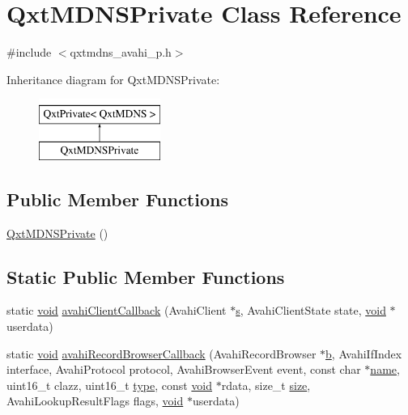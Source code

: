 \hypertarget{class_qxt_m_d_n_s_private}{\section{Qxt\-M\-D\-N\-S\-Private Class Reference}
\label{class_qxt_m_d_n_s_private}
}


{\ttfamily \#include $<$qxtmdns\-\_\-avahi\-\_\-p.\-h$>$}

Inheritance diagram for Qxt\-M\-D\-N\-S\-Private\-:\begin{figure}[H]
\begin{center}
\leavevmode
\includegraphics[height=2.000000cm]{class_qxt_m_d_n_s_private}
\end{center}
\end{figure}
\subsection*{Public Member Functions}
\begin{DoxyCompactItemize}
\item 
\hyperlink{class_qxt_m_d_n_s_private_ade8e8b00bf373f7dbbf53f29374238fc}{Qxt\-M\-D\-N\-S\-Private} ()
\end{DoxyCompactItemize}
\subsection*{Static Public Member Functions}
\begin{DoxyCompactItemize}
\item 
static \hyperlink{group___u_a_v_objects_plugin_ga444cf2ff3f0ecbe028adce838d373f5c}{void} \hyperlink{class_qxt_m_d_n_s_private_a8e6cc77bb59d8b73361398713db013a4}{avahi\-Client\-Callback} (Avahi\-Client $\ast$\hyperlink{glext_8h_ad585a1393cfa368fa9dc3d8ebff640d5}{s}, Avahi\-Client\-State state, \hyperlink{group___u_a_v_objects_plugin_ga444cf2ff3f0ecbe028adce838d373f5c}{void} $\ast$userdata)
\item 
static \hyperlink{group___u_a_v_objects_plugin_ga444cf2ff3f0ecbe028adce838d373f5c}{void} \hyperlink{class_qxt_m_d_n_s_private_a0a47d63556ccf3b50ab6388d5f2b635a}{avahi\-Record\-Browser\-Callback} (Avahi\-Record\-Browser $\ast$\hyperlink{glext_8h_a6eba317e3cf44d6d26c04a5a8f197dcb}{b}, Avahi\-If\-Index interface, Avahi\-Protocol protocol, Avahi\-Browser\-Event event, const char $\ast$\hyperlink{glext_8h_ad977737dfc9a274a62741b9500c49a32}{name}, uint16\-\_\-t clazz, uint16\-\_\-t \hyperlink{glext_8h_a7d05960f4f1c1b11f3177dc963a45d86}{type}, const \hyperlink{group___u_a_v_objects_plugin_ga444cf2ff3f0ecbe028adce838d373f5c}{void} $\ast$rdata, size\-\_\-t \hyperlink{glext_8h_a014d89bd76f74ef3a29c8f04b473eb76}{size}, Avahi\-Lookup\-Result\-Flags flags, \hyperlink{group___u_a_v_objects_plugin_ga444cf2ff3f0ecbe028adce838d373f5c}{void} $\ast$userdata)
\end{DoxyCompactItemize}
